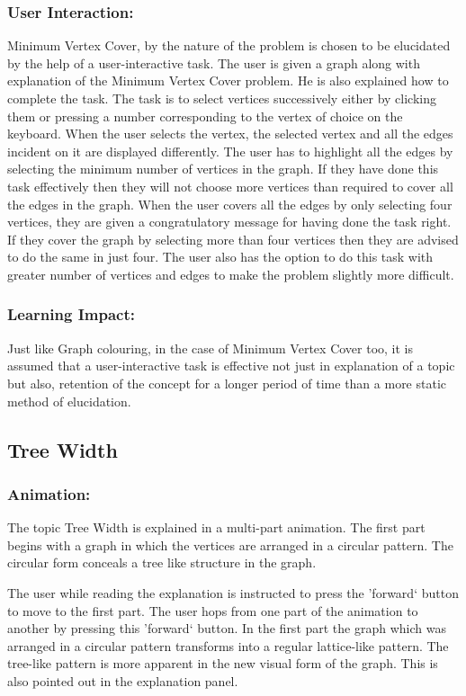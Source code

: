 \subsubsection{User Interaction:}
Minimum Vertex Cover, by the nature of the problem is chosen to be
elucidated by the help of a user-interactive task. The user is given a graph
along with explanation of the Minimum Vertex Cover problem. He is also explained
how to complete the task. The task is to select vertices successively either by
clicking them or pressing a number corresponding to the vertex of choice on the
keyboard.  When the user selects the vertex, the selected vertex and all the edges
incident on it are displayed differently. The user has to highlight all the
edges by selecting the minimum number of vertices in the graph.  If they have done
this task effectively then they will not choose more vertices than required to
cover all the edges in the graph. When the user covers all the edges by only
selecting four vertices, they are given a congratulatory message for having done
the task right. If they cover the graph by selecting more than four vertices
then they are advised to do the same in just four. The user also has the option to do this task with greater
number of vertices and edges to make the problem slightly more difficult.

\subsubsection{Learning Impact:}
Just like Graph colouring, in the case of Minimum Vertex Cover too, it is
assumed that a user-interactive task is effective not just in explanation of a
topic but also, retention of the concept for a longer period of time than a more static method of elucidation.

\subsection{Tree Width}
\subsubsection{Animation:}
The topic Tree Width is explained in a multi-part animation. The first part
begins with a graph in which the vertices are arranged in a circular pattern.
The circular form conceals a tree like structure in the graph. 

The user while reading the explanation is instructed to press the 'forward`
button to move to the first part. The user hops from one part of the animation
to another by pressing this 'forward` button.  In the first part the graph
which was arranged in a circular pattern transforms into a regular
lattice-like pattern. The tree-like pattern is more apparent in the new visual
form of the graph.  This is also pointed out in the explanation panel.  

